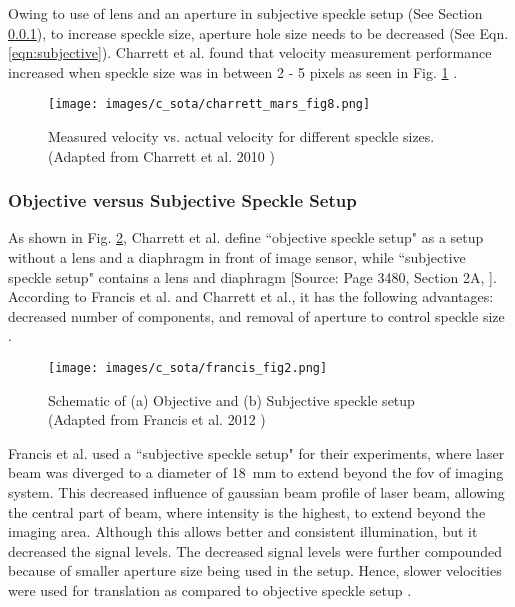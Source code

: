    \vspace{5mm}

    \noindent Owing to use of lens and an aperture in subjective speckle setup (See Section \ref{Subsubsection:Objective_Subjective}), to increase speckle size, aperture hole size needs to be decreased (See Eqn. \ref{eqn:subjective}). Charrett et al. found that velocity measurement performance increased when speckle size was in between 2 - 5 pixels as seen in Fig. \ref{fig:charrett_mars_fig8} \cite{charrett_mars}.

    \begin{figure}[ht]
        \centering
        \texttt{[image: images/c\_sota/charrett\_mars\_fig8.png]}
        \caption{Measured velocity vs. actual velocity for different speckle sizes. (Adapted from Charrett et al. 2010 \cite{charrett_mars})}
        \label{fig:charrett_mars_fig8}
    \end{figure}

    \subsubsection{Objective versus Subjective Speckle Setup}\label{Subsubsection:Objective_Subjective}

    As shown in Fig. \ref{fig:francis_fig2}, Charrett et al. define ``objective speckle setup" as a setup without a lens and a diaphragm in front of image sensor, while ``subjective speckle setup" contains a lens and diaphragm [Source: Page 3480, Section 2A, \cite{francis_autonomous}]. According to Francis et al. and Charrett et al., it has the following advantages: decreased number of components, and removal of aperture to control speckle size \cite{charrett_2018, francis_autonomous}.

    \begin{figure}[ht]
        \centering
        \texttt{[image: images/c\_sota/francis\_fig2.png]}
        \caption{Schematic of (a) Objective and (b) Subjective speckle setup (Adapted from Francis et al. 2012 \cite{francis_autonomous})}
        \label{fig:francis_fig2}
    \end{figure}

    \noindent Francis et al. used a ``subjective speckle setup" for their experiments, where laser beam was diverged to a diameter of \SI{18}{\milli\meter} to extend beyond the \gls{fov} of imaging system. This decreased influence of gaussian beam profile of laser beam, allowing the central part of beam, where intensity is the highest, to extend beyond the imaging area. Although this allows better and consistent illumination, but it decreased the signal levels. The decreased signal levels were further compounded because of smaller aperture size being used in the setup. Hence, slower velocities were used for translation as compared to objective speckle setup \cite{francis_autonomous}.

